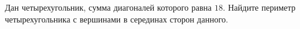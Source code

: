 \begin{ex}
	\begin{condition}
		Дан четырехугольник, сумма диагоналей которого равна \( 18  \). Найдите периметр четырехугольника с вершинами в	серединах сторон данного.
	\end{condition}
\end{ex}